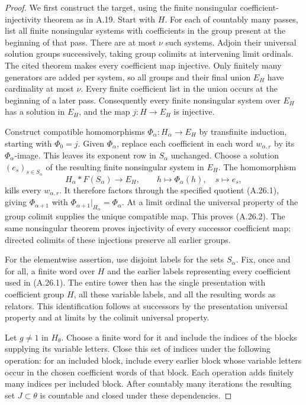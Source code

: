 \begin{proof}
We first construct the target, using the finite nonsingular
coefficient-injectivity theorem
\cite[Theorem~1]{D_OpenAI2026Nonsingular} as in A.19.
Start with $H$. For each of countably many passes, list all
finite nonsingular systems with coefficients in the group
present at the beginning of that pass. There are at most
$\nu$ such systems. Adjoin their universal solution groups
successively, taking group colimits at intervening limit
ordinals. The cited theorem makes every coefficient map
injective. Only finitely many generators are added per
system, so all groups and their final union $E_H$ have
cardinality at most $\nu$. Every finite coefficient list
in the union occurs at the beginning of a later pass.
Consequently every finite nonsingular system over $E_H$
has a solution in $E_H$, and the map $j:H\to E_H$ is
injective.

Construct compatible homomorphisms
$\Phi_\alpha:H_\alpha\to E_H$ by transfinite induction,
starting with $\Phi_0=j$. Given $\Phi_\alpha$, replace
each coefficient in each word $w_{\alpha,r}$ by its
$\Phi_\alpha$-image. This leaves its exponent row in
$S_\alpha$ unchanged. Choose a solution
$(e_s)_{s\in S_\alpha}$ of the resulting finite
nonsingular system in $E_H$. The homomorphism
\[
 H_\alpha*F(S_\alpha)\longrightarrow E_H,
 \qquad h\longmapsto\Phi_\alpha(h),\quad s\longmapsto e_s,
\]
kills every $w_{\alpha,r}$. It therefore factors through
the specified quotient (A.26.1), giving
$\Phi_{\alpha+1}$ with
$\Phi_{\alpha+1}|_{H_\alpha}=\Phi_\alpha$.
At a limit ordinal the universal property of the group
colimit supplies the unique compatible map.
This proves (A.26.2). The same nonsingular theorem proves
injectivity of every successor coefficient map; directed
colimits of these injections preserve all earlier groups.

For the elementwise assertion, use disjoint labels for
the sets $S_\alpha$. Fix, once and for all, a finite word
over $H$ and the earlier labels representing every
coefficient used in (A.26.1). The entire tower then has
the single presentation with coefficient group $H$, all
these variable labels, and all the resulting words as
relators. This identification follows at successors by
the presentation universal property and at limits by
the colimit universal property.

Let $g\ne1$ in $H_\theta$. Choose a finite word for it
and include the indices of the blocks supplying its
variable letters. Close this set of indices under the
following operation: for an included block, include
every earlier block whose variable letters occur in
the chosen coefficient words of that block. Each
operation adds finitely many indices per included
block. After countably many iterations the resulting
set $J\subset\theta$ is countable and closed under
these dependencies.


\end{proof}
